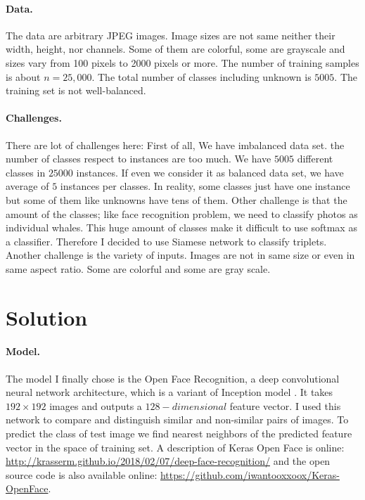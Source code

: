 \documentclass[11pt]{article}
\numberwithin{equation}{section}
\begin{document}
\paragraph{Data.} 
The data are arbitrary JPEG images. Image sizes are not same neither their width, height, nor channels. Some of them are colorful, some are grayscale and sizes vary from 100 pixels to 2000 pixels or more.
The number of training samples is about $n=25,000$.
The total number of classes including unknown is $5005$.
The training set is not well-balanced. 

\paragraph{Challenges.}
There are lot of challenges here: First of all, We have imbalanced data set. the number of classes respect to instances are too much. We have $5005$ different classes in $25000$ instances. If even we consider it as balanced data set, we have average of $5$ instances per classes. In reality,  some classes just have one instance but some of them like unknowns have tens of them. 
Other challenge is that the amount of the classes; like face recognition problem, we need to classify photos as individual whales. This huge amount of classes make it difficult to use softmax as a classifier. Therefore I decided to use Siamese network \cite{chopra2005learning} to classify triplets.
Another challenge is the variety of inputs. Images are not in same size or even in same aspect ratio. Some are colorful and some are gray scale.

\section{Solution}

\paragraph{Model.}

The model I finally chose is the Open Face Recognition\cite{amos2016openface},  a deep convolutional neural network architecture, which is a variant of Inception model \cite{szegedy2015going}. It takes $192\times 192$ images and outputs a $128-dimensional$ feature vector. I used this network to compare and distinguish similar and non-similar pairs of images. To predict the class of test image we find nearest neighbors of the predicted feature vector in the space of training set.
A description of Keras Open Face is online: \url{http://krasserm.github.io/2018/02/07/deep-face-recognition/} and the open source code is also available online: \url{https://github.com/iwantooxxoox/Keras-OpenFace}.
\end{document}
